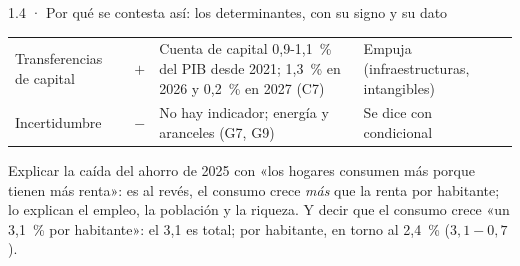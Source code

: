 \begin{complemento}{1.4 · Por qué se contesta así: los determinantes, con su signo y su dato}
\begin{tablacaja}
\begin{tabular}{>{\raggedright\arraybackslash}p{3.1cm}>{\centering\arraybackslash}p{0.9cm}>{\raggedright\arraybackslash}p{6.0cm}>{\raggedright\arraybackslash}p{3.6cm}}
Transferencias de capital & $+$ & Cuenta de capital 0,9-1,1~\% del PIB desde 2021; 1,3~\% en 2026 y 0,2~\% en 2027 (C7) & Empuja (infraestructuras, intangibles) \\
Incertidumbre & $-$ & No hay indicador; energía y aranceles (G7, G9) & Se dice con condicional \\
\bottomrule
\end{tabular}
\end{tablacaja}

 Explicar la caída del ahorro de 2025 con «los hogares consumen más porque tienen más renta»: es al revés, el consumo crece \emph{más} que la renta por habitante; lo explican el empleo, la población y la riqueza. Y decir que el consumo crece «un 3,1~\% por habitante»: el 3,1 es total; por habitante, en torno al 2,4~\% ($3{,}1-0{,}7$).
\end{complemento}
